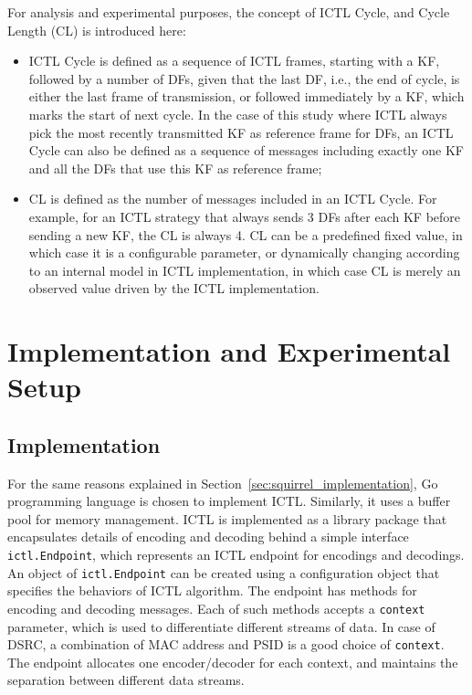 \documentclass[12pt]{report}
\begin{document}
For analysis and experimental purposes, the concept of ICTL Cycle, and Cycle Length (CL) is introduced here:
\begin{itemize}
  \item ICTL Cycle is defined as a sequence of ICTL frames, starting with a KF, followed by a number of DFs, given that the last DF, i.e., the end of cycle, is either the last frame of transmission, or followed immediately by a KF, which marks the start of next cycle. In the case of this study where ICTL always pick the most recently transmitted KF as reference frame for DFs, an ICTL Cycle can also be defined as a sequence of messages including exactly one KF and all the DFs that use this KF as reference frame;
  \item CL is defined as the number of messages included in an ICTL Cycle. For example, for an ICTL strategy that always sends 3 DFs after each KF before sending a new KF, the CL is always 4. CL can be a predefined fixed value, in which case it is a configurable parameter, or dynamically changing according to an internal model in ICTL implementation, in which case CL is merely an observed value driven by the ICTL implementation.
\end{itemize}

\section{Implementation and Experimental Setup}

\subsection{Implementation}

For the same reasons explained in Section~\ref{sec:squirrel_implementation}, Go programming language is chosen to implement ICTL. Similarly, it uses a buffer pool for memory management. ICTL is implemented as a library package that encapsulates details of encoding and decoding behind a simple interface \texttt{ictl.Endpoint}, which represents an ICTL endpoint for encodings and decodings. An object of \texttt{ictl.Endpoint} can be created using a configuration object that specifies the behaviors of ICTL algorithm. The endpoint has methods for encoding and decoding messages. Each of such methods accepts a \texttt{context} parameter, which is used to differentiate different streams of data. In case of DSRC, a combination of MAC address and PSID is a good choice of \texttt{context}. The endpoint allocates one encoder/decoder for each context, and maintains the separation between different data streams.
\end{document}

